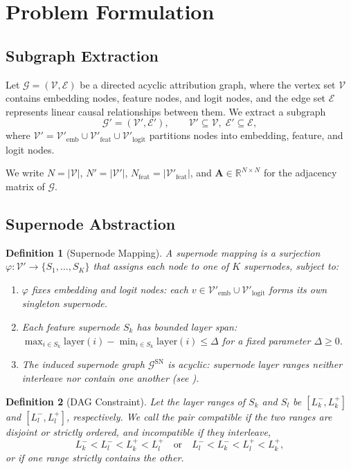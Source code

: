 \documentclass[11pt]{article}
\newcommand{\cV}{\mathcal{V}}
\newcommand{\cE}{\mathcal{E}}
\newcommand{\cG}{\mathcal{G}}
\newcommand{\bA}{\mathbf{A}}
\newcommand{\R}{\mathbb{R}}
\newtheorem{definition}{Definition}
\begin{document}
\section{Problem Formulation}

\subsection{Subgraph Extraction}
Let $\cG=(\cV,\cE)$ be a directed acyclic attribution graph, where the vertex set $\cV$ contains embedding nodes, feature nodes, and logit nodes, and the edge set $\cE$ represents linear causal relationships between them. We extract a subgraph
\[
\cG'=(\cV',\cE'), \qquad \cV'\subseteq \cV,\; \cE'\subseteq \cE,
\]
where $\cV' = \cV'_{\mathrm{emb}} \cup \cV'_{\mathrm{feat}} \cup \cV'_{\mathrm{logit}}$ partitions nodes into embedding, feature, and logit nodes.

We write $N = |\cV|$, $N' = |\cV'|$, $N_{\mathrm{feat}} = |\cV'_{\mathrm{feat}}|$, and $\bA \in \R^{N \times N}$ for the adjacency matrix of $\cG$.

\subsection{Supernode Abstraction}
\label{sec:sn-def}

\begin{definition}[Supernode Mapping]
  A \emph{supernode mapping} is a surjection $\varphi: \cV' \to \{S_1, \ldots, S_K\}$ that assigns each node to one of $K$ supernodes, subject to:
  \begin{enumerate}[label=(\roman*)]
    \item $\varphi$ fixes embedding and logit nodes: each $v \in \cV'_{\mathrm{emb}} \cup \cV'_{\mathrm{logit}}$ forms its own singleton supernode.
    \item Each feature supernode $S_k$ has bounded layer span: $\max_{i \in S_k} \mathrm{layer}(i) - \min_{i \in S_k} \mathrm{layer}(i) \le \Delta$ for a fixed parameter $\Delta \ge 0$.
    \item The induced supernode graph $\cG^{\mathrm{SN}}$ is acyclic: supernode layer ranges neither interleave nor contain one another (see ).
  \end{enumerate}
\end{definition}

\begin{definition}[DAG Constraint]
\label{def:dag-constraint}
  Let the layer ranges of $S_k$ and $S_l$ be $[L^-_k, L^+_k]$ and $[L^-_l, L^+_l]$, respectively. We call the pair \emph{compatible} if the two ranges are disjoint or strictly ordered, and \emph{incompatible} if they interleave,
  \[
    L^-_k < L^-_l < L^+_k < L^+_l \quad \text{or} \quad L^-_l < L^-_k < L^+_l < L^+_k,
  \]
  or if one range strictly contains the other.
\end{definition}
\end{document}
